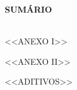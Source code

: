 \documentclass[
]{article}
\author{}
\date{}
\begin{document}
\textbf{SUMÁRIO}\\

\strut \\

<<ANEXO I>>

<<ANEXO II>>

<<ADITIVOS>>
\end{document}

